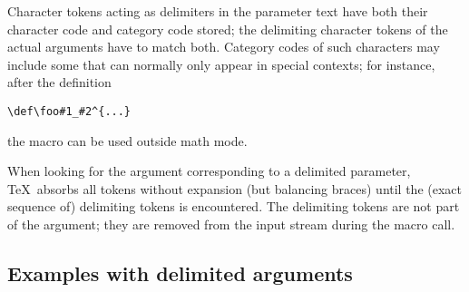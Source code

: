 Character tokens acting as delimiters in the parameter text
have both their character code and
category code stored; the delimiting character tokens of the
actual arguments have to match both.
Category codes of such characters may include some that
can normally only appear in special contexts; for instance, after
the definition
\begin{verbatim}
\def\foo#1_#2^{...}
\end{verbatim}
the macro 
can be used outside math mode.

When looking for the argument corresponding to
a delimited parameter, \TeX\ absorbs all tokens without expansion (but
balancing braces) until the 
(exact sequence of) delimiting tokens is encountered.
The delimiting tokens are not part of the argument;
they are removed from the input stream during the macro call.

\subsection{Examples with delimited arguments}

